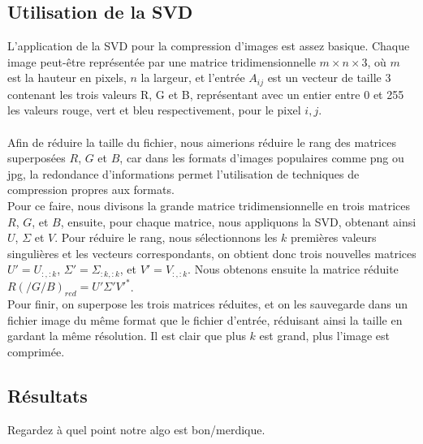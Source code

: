 \documentclass[11pt]{article}
\begin{document}
\subsection*{Utilisation de la SVD}
L'application de la SVD pour la compression d'images est assez basique. Chaque image peut-être représentée par une matrice tridimensionnelle $m \times n \times 3$, où $m$ est la hauteur en pixels, $n$ la largeur, et l'entrée $A_{ij}$ est un vecteur de taille 3 contenant les trois valeurs R, G et B, représentant avec un entier entre 0 et 255 les valeurs rouge, vert et bleu respectivement, pour le pixel $i, j$.\\\\
Afin de réduire la taille du fichier, nous aimerions réduire le rang des matrices superposées $R$, $G$ et $B$, car dans les formats d'images populaires comme png ou jpg, la redondance d'informations permet l'utilisation de techniques de compression propres aux formats.\\
Pour ce faire, nous divisons la grande matrice tridimensionnelle en trois matrices $R$, $G$, et $B$, ensuite, pour chaque matrice, nous appliquons la SVD, obtenant ainsi $U$, $\Sigma$ et $V$. Pour réduire le rang, nous sélectionnons les $k$ premières valeurs singulières et les vecteurs correspondants, on obtient donc trois nouvelles matrices $U' = U_{:,:k}$, $\Sigma' = \Sigma_{:k, :k}$, et $V' = V_{:, :k}$. Nous obtenons ensuite la matrice réduite $R(/G/B)_{red} = U'\Sigma'V'^*$.\\
Pour finir, on superpose les trois matrices réduites, et on les sauvegarde dans un fichier image du même format que le fichier d'entrée, réduisant ainsi la taille en gardant la même résolution. Il est clair que plus $k$ est grand, plus l'image est comprimée.

\subsection*{Résultats}
Regardez à quel point notre algo est bon/merdique.
\end{document}
